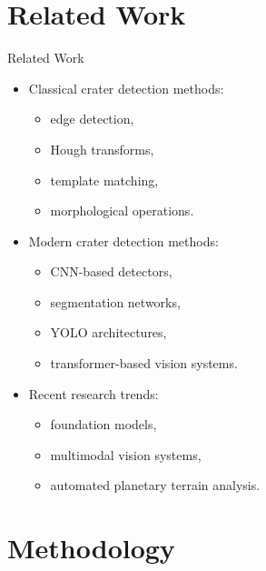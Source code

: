 \documentclass{beamer}
\begin{document}
	\section{Related Work}
	
	\begin{frame}{Related Work}
		
		\begin{itemize}
			\item Classical crater detection methods:
			\begin{itemize}
				\item edge detection,
				\item Hough transforms,
				\item template matching,
				\item morphological operations.
			\end{itemize}
			
			\vspace{0.3cm}
			
			\item Modern crater detection methods:
			\begin{itemize}
				\item CNN-based detectors,
				\item segmentation networks,
				\item YOLO architectures,
				\item transformer-based vision systems.
			\end{itemize}
			
			\vspace{0.3cm}
			
			\item Recent research trends:
			\begin{itemize}
				\item foundation models,
				\item multimodal vision systems,
				\item automated planetary terrain analysis.
			\end{itemize}
			
		\end{itemize}
		
	\end{frame}
	
	\section{Methodology}
	
\end{document}

